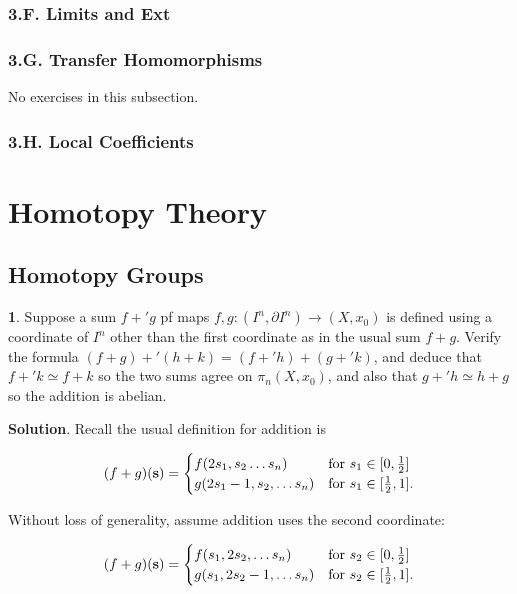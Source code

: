 \documentclass{article}
\begin{document}
\subsubsection*{3.F. Limits and Ext}

\subsubsection*{3.G. Transfer Homomorphisms}

\tab No exercises in this subsection.
\bigskip
\bigskip

\subsubsection*{3.H. Local Coefficients}

\newpage

\section{Homotopy Theory}

\subsection{Homotopy Groups}

\tab \textbf{1}. Suppose a sum $f+'g$ pf maps $f, g:(I^{n}, \partial I^{n})\to (X, x_{0})$ is defined using a coordinate of $I^{n}$ other than the first coordinate as in the usual sum $f+g$. Verify the formula $(f+g) +' (h+k) = (f+'h) + (g+'k)$, and deduce that $f+'k\simeq f+k$ so the two sums agree on $\pi_{n}(X, x_{0})$, and also that $g+'h\simeq h + g$ so the addition is abelian.
\medskip

\textbf{Solution}. Recall the usual definition for addition is 

\[(f+g)(\mathbf{s}) = \begin{cases} f(2s_{1}, s_{2}\ldots s_{n}) & \textnormal{for } s_{1}\in [0, \frac{1}{2}]\\ g(2s_{1} - 1, s_{2},\ldots s_{n}) & \textnormal{for } s_{1}\in [\frac{1}{2}, 1]. \end{cases} \]

Without loss of generality, assume addition uses the second coordinate:

\[(f+g)(\mathbf{s}) = \begin{cases} f(s_{1}, 2s_{2},\ldots s_{n}) & \textnormal{for } s_{2}\in [0, \frac{1}{2}]\\ g(s_{1}, 2s_{2} - 1,\ldots s_{n}) & \textnormal{for } s_{2}\in [\frac{1}{2}, 1]. \end{cases}\]
\end{document}
